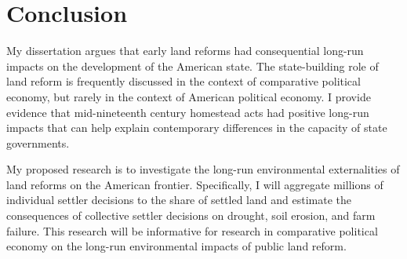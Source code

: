 \chapter{Conclusion}

My dissertation argues that early land reforms had consequential long-run impacts on the development of the American state. The state-building role of land reform is frequently discussed in the context of comparative political economy, but rarely in the context of American political economy. I provide evidence that mid-nineteenth century homestead acts had positive long-run impacts that can help explain contemporary differences in the capacity of state governments.

My proposed research is to investigate the long-run environmental externalities of land reforms on the American frontier. Specifically, I will aggregate millions of individual settler decisions to the share of settled land and estimate the consequences of collective settler decisions on drought, soil erosion, and farm failure. This research will be informative for research in comparative political economy on the long-run environmental impacts of public land reform.

%
%
%
%
%

